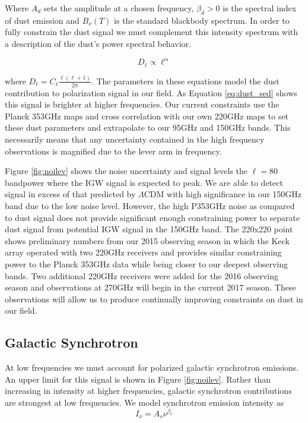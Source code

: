 \documentclass[12pt]{article}
\begin{document}
Where $A_d$ sets the amplitude at a chosen frequency, $\beta _d > 0$ is the spectral
index of dust emission and $B_{\nu}(T)$ is the standard blackbody spectrum. In order
to fully constrain the dust signal we must complement this intensity
spectrum with a description of the dust's power spectral behavior.

\begin{equation}
	D_\ell \propto \ell^\alpha
	\label{eq:dust_aps}
\end{equation}

where $D_\ell=C_\ell \frac{\ell(\ell +1)}{2\pi}$. The parameters in these
equations model the dust contribution to polarization signal in our field. As
Equation \ref{eq:dust_sed} shows this signal is brighter at higher
frequencies. Our current constraints use the Planck 353GHz maps and cross
correlation with our own 220GHz maps to set these dust parameters and
extrapolate to our 95GHz and 150GHz bands. This necessarily means that any
uncertainty contained in the high frequency observations is magnified due to
the lever arm in frequency. 

Figure \ref{fig:noilev} shows the noise uncertainty and signal levels
the $\ell=80$ bandpower where the IGW signal is expected to peak. We are able
to detect signal in excess of that predicted by $\Lambda$CDM with high
significance in our 150GHz band due to the low noise level.
However, the high P353GHz noise as compared to dust signal does not provide
significant enough constraining power to separate dust signal from potential
IGW signal in the 150GHz band. The 220x220 point shows preliminary numbers
from our 2015 observing season in which the Keck array operated with two
220GHz receivers and provides similar constraining power to the Planck 353GHz
data while being closer to our deepest observing bands. Two additional 220GHz
receivers were added for the 2016 observing season and observations at 270GHz
will begin in the current 2017 season. These observations will allow us to
produce continually improving constraints on dust in our field.


\subsection{Galactic Synchrotron}
At low frequencies we must account for polarized galactic synchrotron
emissions. An upper limit for this signal is shown in Figure
\ref{fig:noilev}. Rather than increasing in intensity at higher frequencies,
 galactic synchrotron contributions are strongest at low
frequencies. We model synchrotron emission intensity as
\begin{equation}
	I_\nu = A_s \nu^{\beta _s}
	\label{eq:synch_sed}
\end{equation}
\end{document}
